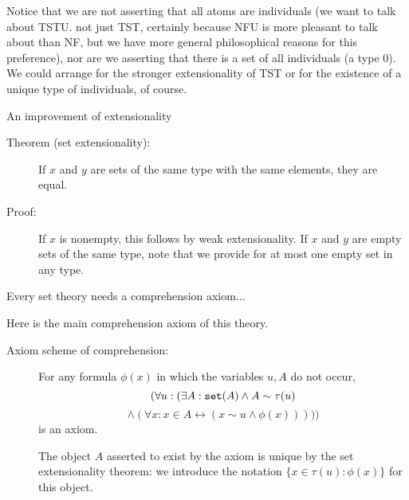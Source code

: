 \documentclass{slides}
\begin{document}
\begin{slide}

Notice that we are not asserting that all atoms are individuals (we want to talk about TSTU. not just TST, certainly because NFU is more pleasant to talk about than NF, but we have more general philosophical reasons for this preference), nor are we asserting
that there is a set of all individuals (a type 0).  We could arrange for the stronger extensionality of TST or for the existence of a unique type of individuals, of course.

\end{slide}

\begin{slide}

{\Large An improvement of extensionality}

\begin{description}

\item[Theorem (set extensionality):]  If $x$ and $y$ are sets of the same type with the same elements, they are equal.

\item[Proof:]  If $x$ is nonempty, this follows by weak extensionality.  If $x$ and $y$ are empty sets of the same type, note that we provide for at most one empty set in any type.

\end{description}

\end{slide}

\begin{slide}



{\Large Every set theory needs a comprehension axiom$\ldots$}

Here is the main comprehension axiom of this theory.

\begin{description}

\item[Axiom scheme of comprehension:]  For any formula $\phi(x)$ in which the variables $u, A$ do not occur, $$(\forall u:(\exists A:{\tt set}(A) \wedge A \sim \tau(u) $$ $$ \wedge (\forall x:x \in A \leftrightarrow (x \sim u \wedge \phi(x)))))$$ is an axiom.

The  object $A$ asserted to exist by the axiom is unique by the set extensionality theorem:  we introduce the notation $\{x \in \tau(u):\phi(x)\}$ for this object.

\end{description}

\end{slide}
\end{document}
